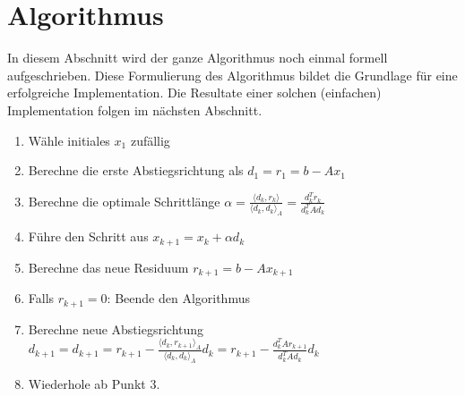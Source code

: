 \section{Algorithmus\label{cg:section:voraussetzungen}}

In diesem Abschnitt wird der ganze Algorithmus noch einmal formell aufgeschrieben.
Diese Formulierung des Algorithmus bildet die Grundlage für eine erfolgreiche Implementation.
Die Resultate einer solchen (einfachen) Implementation folgen im nächsten Abschnitt.

\begin{enumerate}
	\item Wähle initiales $x_1$ zufällig
	\item Berechne die erste Abstiegsrichtung als $d_1 = r_1 =  b-Ax_1$
	\item Berechne die optimale Schrittlänge  $ \alpha	= 	\displaystyle  \frac{\langle d_k , r_k \rangle}{\langle d_k , d_k \rangle_A} 
																			= \frac{d_k^T  r_k}{d_k^T A d_k }$
	\item Führe den Schritt aus $x_{k+1} = x_k + \alpha d_k$
	\item Berechne das neue Residuum $r_{k+1} = b-Ax_{k+1}$
	\item Falls $r_{k+1} = 0$: Beende den Algorithmus
	\item Berechne neue Abstiegsrichtung $d_{k+1} = d_{k+1}	= 	r_{k+1} - \displaystyle \frac{\langle d_k , r_{k+1} \rangle_A}{\langle d_k , d_k \rangle_A} d_k 
															= r_{k+1} - \displaystyle \frac{d_k^T A r_{k+1}}{d_k^T A d_k} d_k $
	\item Wiederhole ab Punkt 3.
\end{enumerate}
